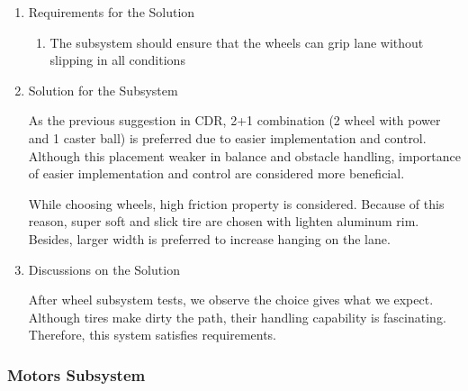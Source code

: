 \documentclass[a4paper,12pt]{article}
\begin{document}
\begin{enumerate}

\item {Requirements for the Solution}


\begin{enumerate}

\item The subsystem should ensure that the wheels can grip lane without slipping in all conditions 

\end{enumerate}



\item {Solution for the Subsystem}


As the previous suggestion in CDR, 2+1 combination (2 wheel with power and 1 caster ball) is preferred due to easier implementation and control. Although this placement weaker in balance and obstacle handling, importance of easier implementation and control are considered more beneficial. 

While choosing wheels, high friction property is considered. Because of this reason, super soft and slick tire are chosen with lighten aluminum rim. Besides, larger width is preferred to increase hanging on the lane.      



\item {Discussions on the Solution}


After wheel subsystem tests, we observe the choice gives what we expect. Although tires make dirty the path, their handling capability is fascinating. Therefore, this system satisfies requirements.


\end{enumerate}





\subsubsection{Motors Subsystem}
\end{document}

